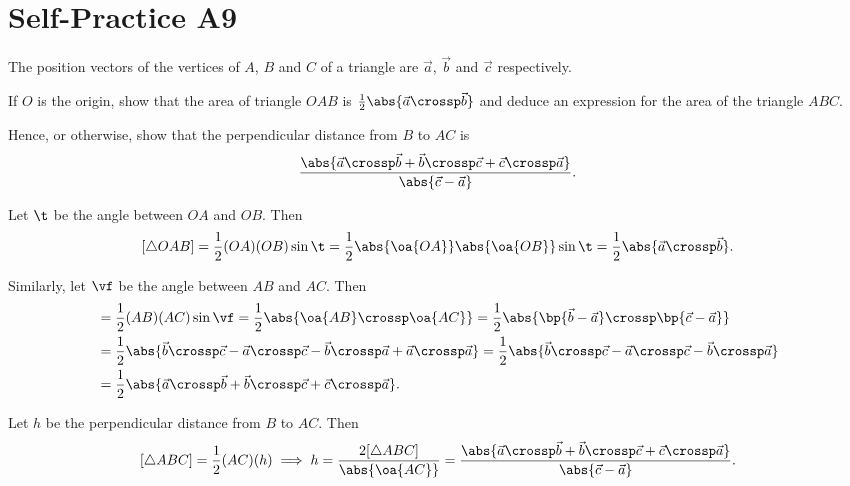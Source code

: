 \section{Self-Practice A9}

\begin{problem}
    The position vectors of the vertices of $A$, $B$ and $C$ of a triangle are $\vec a$, $\vec b$ and $\vec c$ respectively.

    If $O$ is the origin, show that the area of triangle $OAB$ is $\frac12 \abs{\vec a \crossp \vec b}$ and deduce an expression for the area of the triangle $ABC$.

    Hence, or otherwise, show that the perpendicular distance from $B$ to $AC$ is \[\frac{\abs{\vec a \crossp \vec b + \vec b \crossp \vec c + \vec c \crossp \vec a}}{\abs{\vec c - \vec a}}.\]
\end{problem}
\begin{solution}
    Let $\t$ be the angle between $OA$ and $OB$. Then \[[\triangle OAB] = \frac12 (OA) (OB) \sin \t = \frac12 \abs{\oa{OA}} \abs{\oa{OB}} \sin \t = \frac12 \abs{\vec a \crossp \vec b}.\]

    Similarly, let $\vf$ be the angle between $AB$ and $AC$. Then
    \begin{align*}
        [\triangle ABC] &= \frac12 (AB) (AC) \sin \vf = \frac12 \abs{\oa{AB} \crossp \oa{AC}} = \frac12 \abs{\bp{\vec b - \vec a} \crossp \bp{\vec c - \vec a}}\\
        &= \frac12 \abs{\vec b \crossp \vec c - \vec a \crossp \vec c - \vec b \crossp \vec a + \vec a \crossp \vec a} = \frac12 \abs{\vec b \crossp \vec c - \vec a \crossp \vec c - \vec b \crossp \vec a}\\
        &= \frac12 \abs{\vec a \crossp \vec b + \vec b \crossp \vec c + \vec c \crossp \vec a}.
    \end{align*}

    Let $h$ be the perpendicular distance from $B$ to $AC$. Then \[[\triangle ABC] = \frac12 (AC)(h) \implies h = \frac{2[\triangle ABC]}{\abs{\oa{AC}}} = \frac{\abs{\vec a \crossp \vec b + \vec b \crossp \vec c + \vec c \crossp \vec a}}{\abs{\vec c - \vec a}}.\]
\end{solution}

